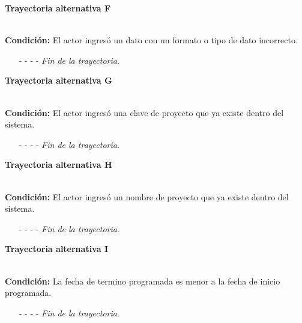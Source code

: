 	\hypertarget{CU2-2:TAF}{\textbf{Trayectoria alternativa F}}\\
	\noindent \textbf{Condición:} El actor ingresó un dato con un formato o tipo de dato incorrecto.
	\begin{enumerate}
		\UCpaso[\UCsist] Muestra el mensaje  señalando el campo que presenta el error en la pantalla .
		\UCpaso Regresa al paso \ref{CU2.1-P5} de la trayectoria principal.
		\item[- -] - - {\em {Fin de la trayectoria}}.
	\end{enumerate}
	\hypertarget{CU2-2:TAG}{\textbf{Trayectoria alternativa G}}\\
	\noindent \textbf{Condición:} El actor ingresó una clave de proyecto que ya existe dentro del sistema.
	\begin{enumerate}
		\UCpaso[\UCsist] Muestra el mensaje  señalando el campo que presenta la duplicidad en la pantalla .
		\UCpaso Regresa al paso \ref{CU2.1-P5} de la trayectoria principal.
		\item[- -] - - {\em {Fin de la trayectoria}}.
	\end{enumerate}
	\hypertarget{CU2-2:TAH}{\textbf{Trayectoria alternativa H}}\\
	\noindent \textbf{Condición:} El actor ingresó un nombre de proyecto que ya existe dentro del sistema.
	\begin{enumerate}
		\UCpaso[\UCsist] Muestra el mensaje  señalando el campo que presenta la duplicidad en la pantalla .
		\UCpaso Regresa al paso \ref{CU2.1-P5} de la trayectoria principal.
		\item[- -] - - {\em {Fin de la trayectoria}}.
	\end{enumerate}
	\hypertarget{CU2-2:TAI}{\textbf{Trayectoria alternativa I}}\\
	\noindent \textbf{Condición:} La fecha de termino programada es menor a la fecha de inicio programada.
	\begin{enumerate}
		\UCpaso[\UCsist] Muestra el mensaje  en el campo de fecha de término programada en la pantalla .
		\UCpaso Regresa al paso \ref{CU2.1-P5} de la trayectoria principal.
		\item[- -] - - {\em {Fin de la trayectoria}}.
	\end{enumerate}